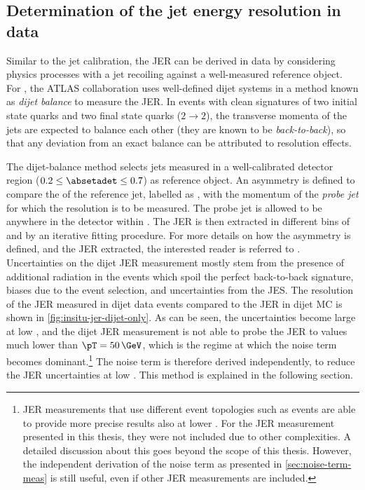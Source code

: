 \subsection{Determination of the jet energy resolution in data}
Similar to the \insitu jet calibration, the JER can be derived in data by considering physics processes with a jet recoiling against a well-measured reference object. For \RunTwo, the ATLAS collaboration uses well-defined dijet systems in a method known as \emph{dijet balance} to measure the JER.
In events with clean signatures of two initial state quarks and two final state quarks ($2 \rightarrow 2$), the transverse momenta of the jets are expected to balance each other (they are known to be \emph{back-to-back}), so that any deviation from an exact balance can be attributed to resolution effects.

The dijet-balance method selects jets measured in a well-calibrated detector region ($0.2 \leq \absetadet \leq 0.7$) as reference object. An asymmetry is defined to compare the \pT of the reference jet, labelled as \pTref, with the momentum of the \emph{probe jet} for which the resolution is to be measured. The probe jet is allowed to be anywhere in the detector within .
The JER is then extracted in different bins of \pTref and \etadet by an iterative fitting procedure. For more details on how the asymmetry is defined, and the JER extracted, the interested reader is referred to . Uncertainties on the dijet JER measurement mostly stem from the presence of additional radiation in the events which spoil the perfect back-to-back signature, biases due to the event selection, and uncertainties from the JES.
The resolution of the JER measured in dijet data events compared to the JER in dijet MC is shown in \cref{fig:insitu-jer-dijet-only}.
As can be seen, the uncertainties become large at low \pT, and the dijet JER measurement is not able to probe the JER to values much lower than $\pT = 50\,\GeV$, which is the regime at which the noise term becomes dominant.\footnote{JER measurements that use different event topologies such as \Zjets events are able to provide more precise results also at lower \pT. For the JER measurement presented in this thesis, they were not included due to other complexities. A detailed discussion about this goes beyond the scope of this thesis. However, the independent derivation of the noise term as presented in \cref{sec:noise-term-meas} is still useful, even if other JER measurements are included.}
The noise term is therefore derived independently, to reduce the JER uncertainties at low \pT. This method is explained in the following section.

